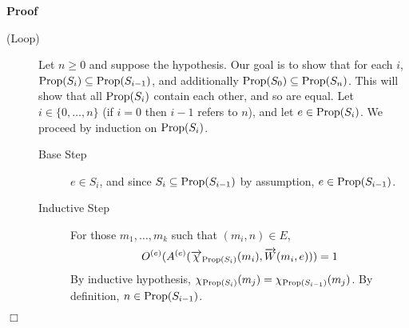 \documentclass{article}
\newcommand{\tmop}[1]{\ensuremath{\operatorname{#1}}}
\newenvironment{proof}{\noindent\textbf{Proof\ }}{\hspace*{\fill}$\Box$\medskip}
\newcommand{\bigchi}{\Large{\chi}}
\newcommand{\Prop}{\textsf{\tmop{Prop}}}
\begin{document}
\begin{proof}
\begin{description}
    \item[(Loop)] Let $n \geq 0$ and suppose the hypothesis. Our goal is to
    show that for each $i$, $\Prop (S_i) \subseteq \Prop (S_{i - 1})$, and
    additionally $\Prop (S_0) \subseteq \Prop (S_n)$. This will show that all
    $\Prop (S_i)$ contain each other, and so are equal. Let $i \in \{ 0,
    \ldots, n \}$ (if $i = 0$ then $i - 1$ refers to $n$), and let $e \in
    \Prop (S_i)$. We proceed by induction on $\Prop (S_i)$.
    \begin{description}
      \item[Base Step] $e \in S_i$, and since $S_i \subseteq \Prop (S_{i -
      1})$ by assumption, $e \in \Prop (S_{i - 1})$.
      
      \item[Inductive Step] For those $m_1, \ldots, m_k$ such that $(m_i, n)
      \in E$,
      \[ O^{(e)} (A^{(e)} (\smash{\overrightarrow{\bigchi}}_{\Prop (S_i)}
         (m_i), \smash{\overrightarrow{W}} (m_i, e))) = 1 \]
      By inductive hypothesis, $\smash{\bigchi}_{\Prop (S_i)} (m_j) =
      \smash{\bigchi}_{\Prop (S_{i - 1})} (m_j)$. By definition, $n \in \Prop
      (S_{i - 1})$.
    \end{description}
  \end{description}
\end{proof}
\end{document}
